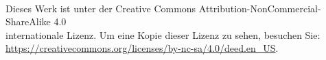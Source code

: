 \begin{changemargin}{-0.35cm}{-0.35cm}
\medskip

\begin{center}
\ccbyncsa\\
\footnotesize
Dieses Werk ist unter der Creative Commons Attribution-NonCommercial-ShareAlike
4.0 \\ internationale Lizenz. Um eine Kopie dieser Lizenz zu sehen, besuchen Sie:
\url{https://creativecommons.org/licenses/by-nc-sa/4.0/deed.en_US}.
\end{center}
\end{changemargin}

\afterpage{\blankpage}
